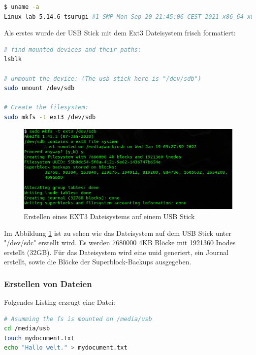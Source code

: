 \begin{lstlisting}[language=bash]
$ uname -a
Linux lab 5.14.6-tsurugi #1 SMP Mon Sep 20 21:45:06 CEST 2021 x86_64 x86_64 x86_64 GNU/Li
\end{lstlisting}  

\newpage
	
Als erstes wurde der USB Stick mit dem Ext3 Dateisystem frisch formatiert:

\begin{lstlisting}[language=bash,caption={Create the FS}]
# find mounted devices and their paths:
lsblk

# unmount the device: (The usb stick here is "/dev/sdb")
sudo umount /dev/sdb

# Create the filesystem:
sudo mkfs -t ext3 /dev/sdb
\end{lstlisting}  

\begin{figure}[H]
	\centering
	\includegraphics[width=12cm,keepaspectratio=true]{pictures/createfs.png}
	\caption{
		Erstellen eines EXT3 Dateisystems auf einem USB Stick
	}
	\label{fig:createfs}
\end{figure}

Im Abbildung \ref{fig:createfs} ist zu sehen wie das Dateisystem auf dem USB Stick unter "/dev/sdc" erstellt wird. Es werden 7680000 4KB Blöcke mit 1921360 Inodes erstellt (32GB). Für das Dateisystem wird eine \ac{uuid} generiert, ein Journal erstellt, sowie die Blöcke der Superblock-Backups ausgegeben.


\subsubsection{Erstellen von Dateien}

Folgendes Listing erzeugt eine Datei:

\begin{lstlisting}[language=bash]
# Asumming the fs is mounted on /media/usb
cd /media/usb
touch mydocument.txt
echo "Hallo welt." > mydocument.txt
\end{lstlisting} 

